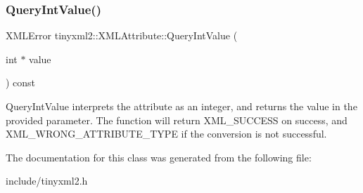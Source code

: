 \subsubsection{\texorpdfstring{QueryIntValue()}{QueryIntValue()}}
{\footnotesize\ttfamily X\+M\+L\+Error tinyxml2\+::\+X\+M\+L\+Attribute\+::\+Query\+Int\+Value (\begin{DoxyParamCaption}\item[{int $\ast$}]{value }\end{DoxyParamCaption}) const}

Query\+Int\+Value interprets the attribute as an integer, and returns the value in the provided parameter. The function will return X\+M\+L\+\_\+\+S\+U\+C\+C\+E\+SS on success, and X\+M\+L\+\_\+\+W\+R\+O\+N\+G\+\_\+\+A\+T\+T\+R\+I\+B\+U\+T\+E\+\_\+\+T\+Y\+PE if the conversion is not successful. 

The documentation for this class was generated from the following file\+:\begin{DoxyCompactItemize}
\item 
include/tinyxml2.\+h\end{DoxyCompactItemize}

